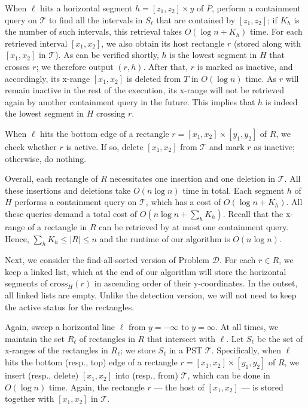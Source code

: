 \documentclass[acmsmall,review,anonymous]{acmart}
\def\vgap{\vspace{1mm}}
\def\T{\mathcal{T}}
\def\cross{\mathrm{cross}}
\begin{document}
{{{\vgap

When $\ell$ hits a horizontal segment $h = [z_1, z_2] \times y$ of $P$, perform a containment query on $\T$ to find all the intervals in $S_\ell$ that are contained by $[z_1, z_2]$; if $K_h$ is the number of such intervals, this retrieval takes $O(\log n + K_h)$ time. For each retrieved interval $[x_1, x_2]$, we also obtain its host rectangle $r$ (stored along with $[x_1, x_2]$ in $\T$). As can be verified shortly, $h$ is the lowest segment in $H$ that crosses $r$; we therefore output $(r, h)$. After that, $r$ is marked as inactive, and accordingly, its x-range $[x_1, x_2]$ is deleted from $T$ in $O(\log n)$ time. As $r$ will remain inactive in the rest of the execution, its x-range will not be retrieved again by another containment query in the future. This implies that $h$ is indeed the lowest segment in $H$ crossing $r$.

\vgap

When $\ell$ hits the bottom edge of a rectangle $r = [x_1, x_2] \times [y_1, y_2]$ of $R$, we check whether $r$ is active. If so, delete $[x_1, x_2]$ from $\T$ and mark $r$ as inactive; otherwise, do nothing.

\vgap

Overall, each rectangle of $R$ necessitates one insertion and one deletion in $\T$. All these insertions and deletions take $O(n \log n)$ time in total. Each segment $h$ of $H$ performs a containment query on $\T$, which has a cost of $O(\log n + K_h)$. All these queries demand a total cost of $O(n \log n + \sum_h K_h)$. Recall that the x-range of a rectangle in $R$ can be retrieved by at most one containment query. Hence, $\sum_h K_h \le |R| \le n$ and the runtime of our algorithm is $O(n \log n)$.

\vgap

Next, we consider the find-all-sorted version of Problem $\mathscr{D}$. For each $r \in R$, we keep a linked list, which at the end of our algorithm will store the horizontal segments of $\cross_H(r)$ in ascending order of their y-coordinates. In the outset, all linked lists are empty. Unlike the detection version, we will not need to keep the active status for the rectangles.

\vgap

Again, sweep a horizontal line $\ell$ from $y = -\infty$ to $y = \infty$. At all times, we maintain the set $R_\ell$ of rectangles in $R$ that intersect with $\ell$. Let $S_\ell$ be the set of x-ranges of the rectangles in $R_\ell$; we store $S_\ell$ in a PST $\T$. Specifically, when $\ell$ hits the bottom (resp., top) edge of a rectangle $r = [x_1, x_2] \times [y_1, y_2]$ of $R$, we insert (resp., delete) $[x_1, x_2]$ into (resp., from) $\T$, which can be done in $O(\log n)$ time. Again, the rectangle $r$ --- the host of $[x_1, x_2]$ --- is stored together with $[x_1, x_2]$ in $\T$.

}}}
\end{document}
